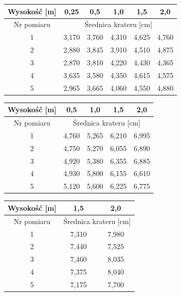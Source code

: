 \documentclass[a4paper,12pt]{article}
\begin{document}
\begin{center}
    \begin{tabular}{|c|c|c|c|c|c|}
        \hline
        Wysokość [m] & 0,25 & 0,5 & 1,0 & 1,5 & 2,0 \\
        \hline
        Nr pomiaru & \multicolumn{5}{c|}{Średnica krateru [cm]} \\
        \hline
        1 & 3,170 & 3,760 & 4,310 & 4,625 & 4,760 \\
        2 & 2,880 & 3,845 & 3,910 & 4,510 & 4,875 \\
        3 & 2,870 & 3,810 & 4,220 & 4,430 & 4,365 \\
        4 & 3,635 & 3,580 & 4,350 & 4,615 & 4,575 \\
        5 & 2,965 & 3,665 & 4,060 & 4,550 & 4,880 \\
        \hline
    \end{tabular}
    \label{tab:kratery_mala}
\end{center}

\begin{center}
    \begin{tabular}{|c|c|c|c|c|}
        \hline
        Wysokość [m] & 0,5 & 1,0 & 1,5 & 2,0 \\
        \hline
        Nr pomiaru & \multicolumn{4}{c|}{Średnica krateru [cm]} \\
        \hline
        1 & 4,760 & 5,265 & 6,210 & 6,995 \\
        2 & 4,750 & 5,270 & 6,055 & 6,890 \\
        3 & 4,920 & 5,380 & 6,355 & 6,885 \\
        4 & 4,930 & 5,800 & 6,155 & 6,610 \\
        5 & 5,120 & 5,600 & 6,225 & 6,775 \\
        \hline
    \end{tabular}
    \label{tab:kratery_srednia}
\end{center}

\begin{center}
    \begin{tabular}{|c|c|c|}
        \hline
        Wysokość [m] & 1,5 & 2,0 \\
        \hline
        Nr pomiaru & \multicolumn{2}{c|}{Średnica krateru [cm]} \\
        \hline
        1 & 7,310 & 7,980 \\
        2 & 7,440 & 7,525 \\
        3 & 7,460 & 8,035 \\
        4 & 7,375 & 8,040 \\
        5 & 7,175 & 7,700 \\
        \hline
    \end{tabular}
    \label{tab:kratery_duza}
\end{center}
\end{document}
